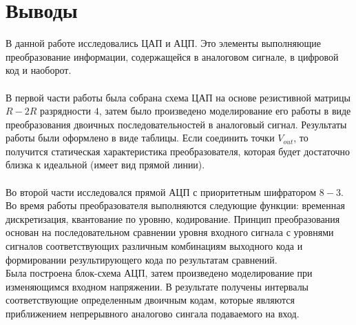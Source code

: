 \documentclass[12pt]{article}
\begin{document}
\section*{Выводы}
В данной работе исследовались ЦАП и АЦП. Это элементы выполняющие преобразование информации, содержащейся в аналоговом сигнале, в цифровой код и наоборот. \\
\ \\
В первой части работы была собрана схема ЦАП на основе резистивной матрицы $R-2R$ разрядности $4$, затем было произведено моделирование его работы в виде преобразования двоичных последовательностей в аналоговый сигнал. Результаты работы были оформлено в виде таблицы. Если соединить точки $V_{out}$, то получится статическая характеристика преобразователя, которая будет достаточно близка к идеальной (имеет вид прямой линии). \\
\ \\
Во второй части исследовался прямой АЦП с приоритетным шифратором $8-3$. Во время работы преобразователя выполняются следующие функции: временная дискретизация, квантование по уровню, кодирование. Принцип преобразования основан на последовательном сравнении уровня входного сигнала с уровнями сигналов соответствующих различным комбинациям выходного кода и формировании результирующего кода по результатам сравнений. \\
Была построена блок-схема АЦП, затем произведено моделирование при изменяющимся входном напряжении. В результате получены интервалы соответствующие определенным двоичным кодам, которые являются приближением непрерывного аналогово сингала подаваемого на вход.
\end{document}
